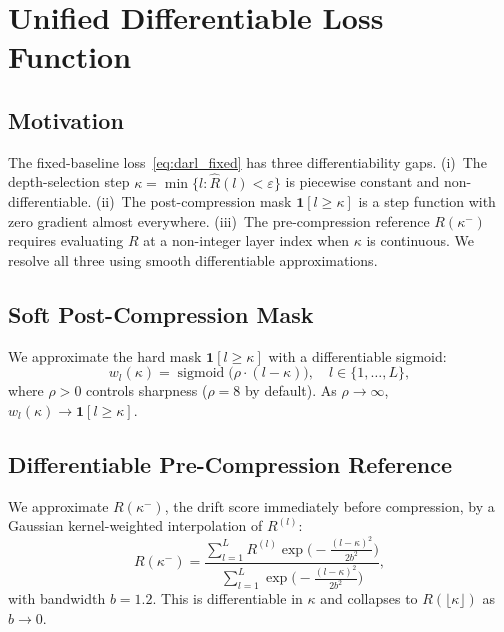 \documentclass[lettersize,journal]{IEEEtran}
\newcommand{\sigmoid}{\operatorname{sigmoid}}
\newcommand{\bR}{\hat{R}}
\begin{document}
\section{Unified Differentiable Loss Function}
\label{sec:loss}

\subsection{Motivation}

The fixed-baseline loss~\eqref{eq:darl_fixed} has three differentiability
gaps.
(i)~The depth-selection step $\kappa = \min\{l : \bR(l) < \varepsilon\}$
is piecewise constant and non-differentiable.
(ii)~The post-compression mask $\mathbf{1}[l \geq \kappa]$ is a step
function with zero gradient almost everywhere.
(iii)~The pre-compression reference $R(\kappa^-)$ requires evaluating
$R$ at a non-integer layer index when $\kappa$ is continuous.
We resolve all three using smooth differentiable approximations.

\subsection{Soft Post-Compression Mask}

We approximate the hard mask $\mathbf{1}[l \geq \kappa]$ with a
differentiable sigmoid:
\begin{equation}
  w_l(\kappa) = \sigmoid\!\bigl(\rho \cdot (l - \kappa)\bigr),
  \quad l \in \{1,\ldots,L\},
  \label{eq:postmask}
\end{equation}
where $\rho > 0$ controls sharpness ($\rho = 8$ by default).
As $\rho \to \infty$, $w_l(\kappa) \to \mathbf{1}[l \geq \kappa]$.

\subsection{Differentiable Pre-Compression Reference}

We approximate $R(\kappa^-)$, the drift score immediately
before compression, by a Gaussian kernel-weighted interpolation
of $R^{(l)}$:
\begin{equation}
  R(\kappa^-) = \frac{\sum_{l=1}^L R^{(l)} \exp\!\bigl(-\tfrac{(l - \kappa)^2}{2b^2}\bigr)}
               {\sum_{l=1}^L \exp\!\bigl(-\tfrac{(l-\kappa)^2}{2b^2}\bigr)},
  \label{eq:precompression}
\end{equation}
with bandwidth $b = 1.2$.
This is differentiable in $\kappa$ and collapses to $R(\lfloor\kappa\rfloor)$
as $b \to 0$.
\end{document}
